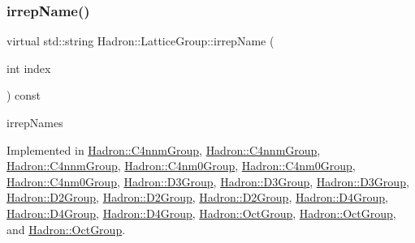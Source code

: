 \mbox{\label{structHadron_1_1LatticeGroup_a4bc5620218c2a73157e19bc4451fe746}} 
\subsubsection{\texorpdfstring{irrepName()}{irrepName()}\hspace{0.1cm}{\footnotesize\ttfamily [3/3]}}
{\footnotesize\ttfamily virtual std\+::string Hadron\+::\+Lattice\+Group\+::irrep\+Name (\begin{DoxyParamCaption}\item[{int}]{index }\end{DoxyParamCaption}) const\hspace{0.3cm}{\ttfamily [pure virtual]}}

irrep\+Names 

Implemented in \mbox{\hyperlink{structHadron_1_1C4nnmGroup_ac2b3ee6989ddbd93bc63c46ac9626997}{Hadron\+::\+C4nnm\+Group}}, \mbox{\hyperlink{structHadron_1_1C4nnmGroup_ac2b3ee6989ddbd93bc63c46ac9626997}{Hadron\+::\+C4nnm\+Group}}, \mbox{\hyperlink{structHadron_1_1C4nnmGroup_ac2b3ee6989ddbd93bc63c46ac9626997}{Hadron\+::\+C4nnm\+Group}}, \mbox{\hyperlink{structHadron_1_1C4nm0Group_ae7e7c420d17cacaed69a74902af72dcc}{Hadron\+::\+C4nm0\+Group}}, \mbox{\hyperlink{structHadron_1_1C4nm0Group_ae7e7c420d17cacaed69a74902af72dcc}{Hadron\+::\+C4nm0\+Group}}, \mbox{\hyperlink{structHadron_1_1C4nm0Group_ae7e7c420d17cacaed69a74902af72dcc}{Hadron\+::\+C4nm0\+Group}}, \mbox{\hyperlink{structHadron_1_1D3Group_a3e60ca3001ddc0176179107cfed2d621}{Hadron\+::\+D3\+Group}}, \mbox{\hyperlink{structHadron_1_1D3Group_a3e60ca3001ddc0176179107cfed2d621}{Hadron\+::\+D3\+Group}}, \mbox{\hyperlink{structHadron_1_1D3Group_a3e60ca3001ddc0176179107cfed2d621}{Hadron\+::\+D3\+Group}}, \mbox{\hyperlink{structHadron_1_1D2Group_a502111e32a238c50b248b9f7b0625385}{Hadron\+::\+D2\+Group}}, \mbox{\hyperlink{structHadron_1_1D2Group_a502111e32a238c50b248b9f7b0625385}{Hadron\+::\+D2\+Group}}, \mbox{\hyperlink{structHadron_1_1D2Group_a502111e32a238c50b248b9f7b0625385}{Hadron\+::\+D2\+Group}}, \mbox{\hyperlink{structHadron_1_1D4Group_a5f121bd08a7add3ddf660c7e3478cb9e}{Hadron\+::\+D4\+Group}}, \mbox{\hyperlink{structHadron_1_1D4Group_a5f121bd08a7add3ddf660c7e3478cb9e}{Hadron\+::\+D4\+Group}}, \mbox{\hyperlink{structHadron_1_1D4Group_a5f121bd08a7add3ddf660c7e3478cb9e}{Hadron\+::\+D4\+Group}}, \mbox{\hyperlink{structHadron_1_1OctGroup_a58f84ff32d1dce2277f3b9da9d35d594}{Hadron\+::\+Oct\+Group}}, \mbox{\hyperlink{structHadron_1_1OctGroup_a58f84ff32d1dce2277f3b9da9d35d594}{Hadron\+::\+Oct\+Group}}, and \mbox{\hyperlink{structHadron_1_1OctGroup_a58f84ff32d1dce2277f3b9da9d35d594}{Hadron\+::\+Oct\+Group}}.

